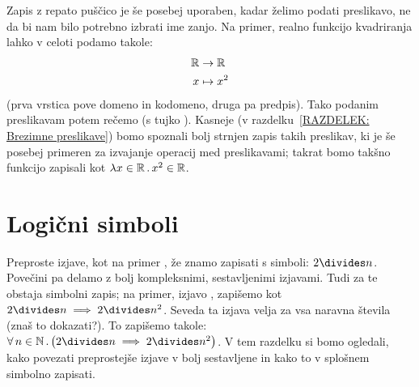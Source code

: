 \begin{itemize}
                                Zapis z repato puščico je še posebej uporaben, kadar želimo podati preslikavo, ne da bi nam bilo potrebno izbrati ime zanjo. Na primer, realno funkcijo kvadriranja lahko v celoti podamo takole:
                                \begin{align*}
                                        \mathbb{R} &\to \mathbb{R} \\
                                        x &\mapsto x^2
                                \end{align*}
                                (prva vrstica pove domeno in kodomeno, druga pa predpis). Tako podanim preslikavam potem rečemo  (s tujko ). Kasneje (v razdelku~\ref{RAZDELEK: Brezimne preslikave}) bomo spoznali bolj strnjen zapis takih preslikav, ki je še posebej primeren za izvajanje operacij med preslikavami; takrat bomo takšno funkcijo zapisali kot $\xlam{x}[\RR]{x^2}[\RR]$.
                \end{itemize}




        \section{Logični simboli}\label{RAZDELEK: Logični simboli}

                Preproste izjave, kot na primer , že znamo zapisati s simboli: $2 \divides n$. Povečini pa delamo z bolj kompleksnimi, sestavljenimi izjavami. Tudi za te obstaja simbolni zapis; na primer, izjavo , zapišemo kot $2 \divides n \implies 2 \divides n^2$. Seveda ta izjava velja za vsa naravna števila (znaš to dokazati?). To zapišemo takole: $\all{n}[\NN]{2 \divides n \implies 2 \divides n^2}$. V tem razdelku si bomo ogledali, kako povezati preprostejše izjave v bolj sestavljene in kako to v splošnem simbolno zapisati.

